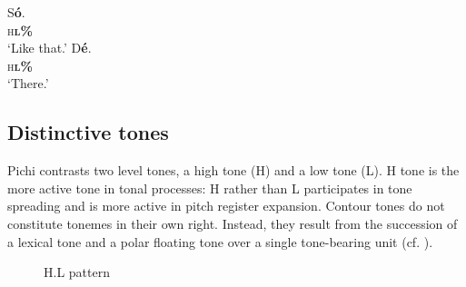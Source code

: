 \ea\label{ex:key:45}
\gll      S\textbf{ó}.\\
\textsc{h}\textbf{\textsc{l\%}}\\
\glt ‘Like that.’
\z
\ea\label{ex:key:46}
\gll    D\textbf{é}.\\
\textsc{h}\textbf{\textsc{l\%}}\\
\glt ‘There.’
\z

\subsection{Distinctive tones}

Pichi contrasts two level tones, a high tone (H) and a low tone (L). H tone is the more active tone in tonal processes: H rather than L participates in tone spreading and is more active in pitch register expansion. Contour tones do not constitute tonemes in their own right. Instead, they result from the succession of a lexical tone and a polar floating tone over a single tone-bearing unit (cf. ). 



\begin{figure}
\caption{H.L pattern}
\label{fig:key:3.5}
\end{figure}

